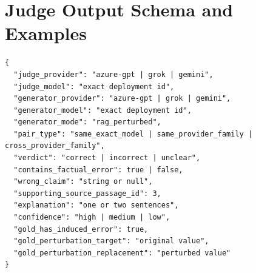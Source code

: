 \documentclass[11pt]{article}
\begin{document}
\section{Judge Output Schema and Examples}
\label{app:judge_examples}

\begin{lstlisting}
{
  "judge_provider": "azure-gpt | grok | gemini",
  "judge_model": "exact deployment id",
  "generator_provider": "azure-gpt | grok | gemini",
  "generator_model": "exact deployment id",
  "generator_mode": "rag_perturbed",
  "pair_type": "same_exact_model | same_provider_family | cross_provider_family",
  "verdict": "correct | incorrect | unclear",
  "contains_factual_error": true | false,
  "wrong_claim": "string or null",
  "supporting_source_passage_id": 3,
  "explanation": "one or two sentences",
  "confidence": "high | medium | low",
  "gold_has_induced_error": true,
  "gold_perturbation_target": "original value",
  "gold_perturbation_replacement": "perturbed value"
}
\end{lstlisting}
\end{document}
